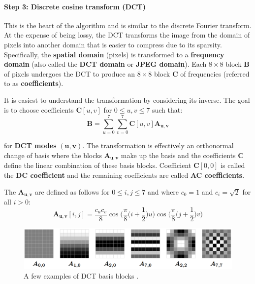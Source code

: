 \documentclass[11pt,a4paper,twoside,openright]{report}
\begin{document}
\paragraph{Step 3: Discrete cosine transform (DCT)} This is the heart of the algorithm and is similar to the discrete Fourier transform. At the expense of being lossy, the DCT transforms the image from the domain of pixels into another domain that is easier to compress due to its sparsity. Specifically, the \textbf{spatial domain} (pixels) is transformed to a \textbf{frequency domain} (also called the \textbf{DCT domain} or \textbf{JPEG domain}). Each $8 \times 8$ block $\bm{B}$ of pixels undergoes the DCT to produce an $8 \times 8$ block $\bm{C}$ of frequencies (referred to as \textbf{coefficients}).

It is easiest to understand the transformation by considering its inverse. The goal is to choose coefficients $\bm{C}[u,v]$ for $0 \leq u,v \leq 7$ such that:
\begin{equation*}
    \bm{B} = \sum_{u=0}^7 \sum_{v=0}^7 \bm{C}[u,v] \bm{A_{u,v}}
\end{equation*}

for \textbf{DCT modes} $\bm{(u,v)}$. The transformation is effectively an orthonormal change of basis where the blocks $\bm{A_{u,v}}$ make up the basis and the coefficients $\bm{C}$ define the linear combination of these basis blocks. Coefficient $\bm{C}[0,0]$ is called the \textbf{DC coefficient} and the remaining coefficients are called \textbf{AC coefficients}.

The $\bm{A_{u,v}}$ are defined as follows for $0 \leq i,j \leq 7$ and where $c_0=1$ and $c_i=\sqrt{2}$ for all $i > 0$:
\begin{equation*}
    \bm{A_{u,v}}[i,j] = \frac{c_u c_v}{8} \cos{\Bigg(\frac{\pi}{8}\Big(i + \frac{1}{2}\Big)u\Bigg)} \cos{\Bigg(\frac{\pi}{8}\Big(j + \frac{1}{2}\Big)v\Bigg)}
\end{equation*}

\begin{figure}[htbp] 
	\begin{center}
		\includegraphics[width=0.75\linewidth]{dct_basis_examples.png}
		\caption{A few examples of DCT basis blocks \cite{ker-notes}.}
		\label{fig:dct-basis-examples}
	\end{center}
\end{figure}
\end{document}
